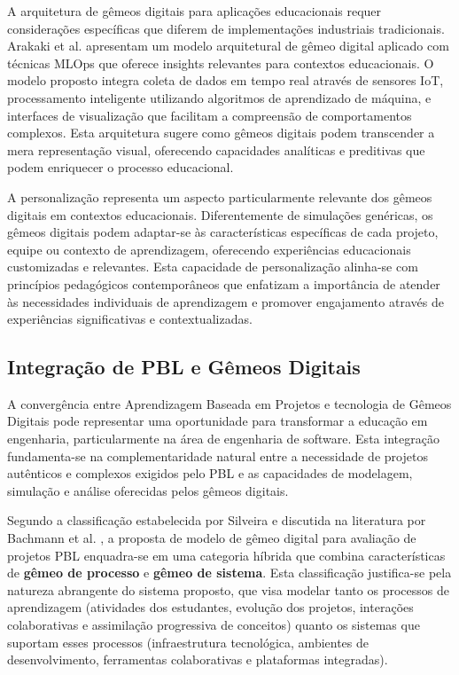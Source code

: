 \documentclass[12pt,a4paper]{article}
\begin{document}
A arquitetura de gêmeos digitais para aplicações educacionais requer considerações específicas que diferem de implementações industriais tradicionais. Arakaki et al. \cite{arakaki2022} apresentam um modelo arquitetural de gêmeo digital aplicado com técnicas MLOps que oferece insights relevantes para contextos educacionais. O modelo proposto integra coleta de dados em tempo real através de sensores IoT, processamento inteligente utilizando algoritmos de aprendizado de máquina, e interfaces de visualização que facilitam a compreensão de comportamentos complexos. Esta arquitetura sugere como gêmeos digitais podem transcender a mera representação visual, oferecendo capacidades analíticas e preditivas que podem enriquecer o processo educacional.

A personalização representa um aspecto particularmente relevante dos gêmeos digitais em contextos educacionais. Diferentemente de simulações genéricas, os gêmeos digitais podem adaptar-se às características específicas de cada projeto, equipe ou contexto de aprendizagem, oferecendo experiências educacionais customizadas e relevantes. Esta capacidade de personalização alinha-se com princípios pedagógicos contemporâneos que enfatizam a importância de atender às necessidades individuais de aprendizagem e promover engajamento através de experiências significativas e contextualizadas.

\subsection{Integração de PBL e Gêmeos Digitais}

A convergência entre Aprendizagem Baseada em Projetos e tecnologia de Gêmeos Digitais pode representar uma oportunidade para transformar a educação em engenharia, particularmente na área de engenharia de software. Esta integração fundamenta-se na complementaridade natural entre a necessidade de projetos autênticos e complexos exigidos pelo PBL e as capacidades de modelagem, simulação e análise oferecidas pelos gêmeos digitais.

Segundo a classificação estabelecida por Silveira \cite{silveira2024panorama} e discutida na literatura por Bachmann et al. \cite{bachmann2023}, a proposta de modelo de gêmeo digital para avaliação de projetos PBL enquadra-se em uma categoria híbrida que combina características de \textbf{gêmeo de processo} e \textbf{gêmeo de sistema}. Esta classificação justifica-se pela natureza abrangente do sistema proposto, que visa modelar tanto os processos de aprendizagem (atividades dos estudantes, evolução dos projetos, interações colaborativas e assimilação progressiva de conceitos) quanto os sistemas que suportam esses processos (infraestrutura tecnológica, ambientes de desenvolvimento, ferramentas colaborativas e plataformas integradas).
\end{document}
